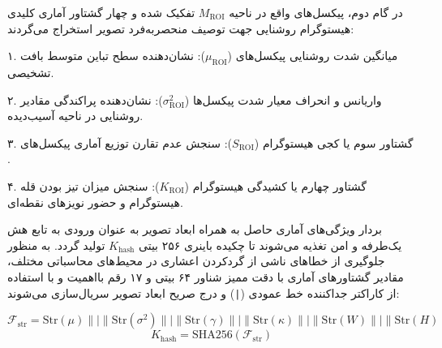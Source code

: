 

در گام دوم، پیکسل‌های واقع در ناحیه $M_{\mathrm{ROI}}$ تفکیک شده و چهار گشتاور آماری کلیدی هیستوگرام روشنایی جهت توصیف منحصر‌به‌فرد تصویر استخراج می‌گردند:\par

۱. میانگین شدت روشنایی پیکسل‌های  ($\mu_{\mathrm{ROI}}$): نشان‌دهنده سطح تباین متوسط بافت تشخیصی.\par

۲. واریانس و انحراف معیار شدت پیکسل‌ها ($\sigma_{\mathrm{ROI}}^2$): نشان‌دهنده پراکندگی مقادیر روشنایی در ناحیه آسیب‌دیده.\par

۳. گشتاور سوم یا کجی هیستوگرام ($S_{\mathrm{ROI}}$): سنجش عدم تقارن توزیع آماری پیکسل‌های .\par

۴. گشتاور چهارم یا کشیدگی هیستوگرام ($K_{\mathrm{ROI}}$): سنجش میزان تیز بودن قله هیستوگرام و حضور نویزهای نقطه‌ای.\par



بردار ویژگی‌های آماری حاصل به همراه ابعاد تصویر به عنوان ورودی به تابع هش یک‌طرفه و امن  تغذیه می‌شوند تا چکیده باینری ۲۵۶ بیتی $K_{\mathrm{hash}}$ تولید گردد. به منظور جلوگیری از خطاهای ناشی از گردکردن اعشاری در محیط‌های محاسباتی مختلف، مقادیر گشتاورهای آماری با دقت ممیز شناور ۶۴ بیتی و ۱۷ رقم بااهمیت  و با استفاده از کاراکتر جداکننده خط عمودی (\texttt{|}) و درج صریح ابعاد تصویر سریال‌سازی می‌شوند:\par



\[\mathcal{F}_{\mathrm{str}} = \mathrm{Str}(\mu) \parallel \texttt{|} \parallel \mathrm{Str}(\sigma^2) \parallel \texttt{|} \parallel \mathrm{Str}(\gamma) \parallel \texttt{|} \parallel \mathrm{Str}(\kappa) \parallel \texttt{|} \parallel \mathrm{Str}(W) \parallel \texttt{|} \parallel \mathrm{Str}(H)\]
\[K_{\mathrm{hash}} = \mathrm{SHA256}(\mathcal{F}_{\mathrm{str}})\]\par

